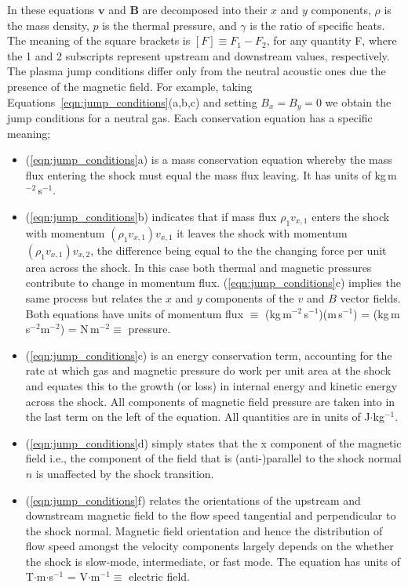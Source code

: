 In these equations $\mathbf{v}$ and $\mathbf{B}$ are decomposed into their $x$ and $y$ components, $\rho$ is the mass density, $p$ is the thermal pressure, and $\gamma$ is the ratio of specific heats. The meaning of the square brackets is $[F]\equiv F_{1}-F_{2}$, for any quantity F, where the 1 and 2 subscripts represent upstream and downstream values, respectively. The plasma jump conditions differ only from the neutral acoustic ones due the presence of the magnetic field. For example, taking Equations~\ref{eqn:jump_conditions}(a,b,c) and setting $B_{x}=B_{y}=0$ we obtain the jump conditions for a neutral gas. Each conservation equation has a specific meaning; 
\begin{itemize}
\item (\ref{eqn:jump_conditions}a) is a mass conservation equation whereby the mass flux entering the shock must equal the mass flux leaving. It has units of kg\,m$^{-2}$\,s$^{-1}$.
\item (\ref{eqn:jump_conditions}b) indicates that if mass flux $\rho_{1} v_{x,1}$ enters the shock with momentum $(\rho_{1} v_{x,1})v_{x,1}$ it leaves the shock with momentum $(\rho_{1} v_{x,1})v_{x,2}$, the difference being equal to the the changing force per unit area across the shock. In this case both thermal and magnetic pressures contribute to change in momentum flux. (\ref{eqn:jump_conditions}c) implies the same process but relates the $x$ and $y$ components of the $v$ and $B$ vector fields. Both equations have units of momentum flux $\equiv$ (kg\,m$^{-2}$\,s$^{-1}$)(m\,s$^{-1}$) = (kg\,m\,s$^{-2}$m$^{-2}$) = N\,m$^{-2}\equiv$ pressure.
\item (\ref{eqn:jump_conditions}c) is an energy conservation term, accounting for the rate at which gas and magnetic pressure do work per unit area at the shock and equates this to the growth (or loss) in internal energy and kinetic energy across the shock. All components of magnetic field pressure are taken into in the last term on the left of the equation. All quantities are in units of J$\cdot$kg$^{-1}$.
\item (\ref{eqn:jump_conditions}d) simply states that the x component of the magnetic field i.e., the component of the field that is (anti-)parallel to the shock normal $\hat{n}$ is unaffected by the shock transition. 
\item (\ref{eqn:jump_conditions}f) relates the orientations of the upstream and downstream magnetic field to the flow speed tangential and perpendicular to the shock normal. Magnetic field orientation and hence the distribution of flow speed amongst the velocity components largely depends on the whether the shock is slow-mode, intermediate, or fast mode. The equation has units of T$\cdot$m$\cdot$s$^{-1}$ = V$\cdot$m$^{-1}\equiv$ electric field.
\end{itemize}

